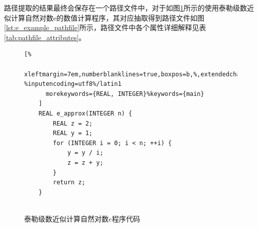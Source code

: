 路径提取的结果最终会保存在一个路径文件中，对于如图\ref{lst:e_example_code}所示的使用泰勒级数近似计算自然对数e的数值计算程序，其对应抽取得到路径文件如图\ref{lst:e_example_pathfile}所示，路径文件中各个属性详细解释见表\ref{tab:pathfile_attributes}。


\begin{figure}[thbp]
    \begin{lstlisting}[%
      xleftmargin=7em,numberblanklines=true,boxpos=b,%,extendedchars=\true, %inputencoding=utf8%/latin1
      morekeywords={REAL, INTEGER}%keywords={main}
    ]
    REAL e_approx(INTEGER n) {
        REAL z = 2; 
        REAL y = 1;
        for (INTEGER i = 0; i < n; ++i) {
            y = y / i;
            z = z + y;
        }
        return z;
    }
    
    \end{lstlisting}
    \caption{泰勒级数近似计算自然对数$e$程序代码}
    \label{lst:e_example_code}
\end{figure}

